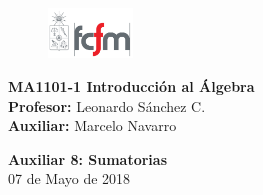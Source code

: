 \documentclass[letterpaper,11pt]{article}
\theoremstyle{plain}
\begin{document}
\newpage
\pagestyle{fancy}
\fancyhf{}

\begin{figure} %
    \vspace{-5mm}
    \includegraphics[width=0.2\textwidth]{img/fcfm2.png}
\end{figure}


\noindent
\textbf{MA1101-1 Introducción al Álgebra}\\
\textbf{Profesor: }Leonardo Sánchez C.\\
\textbf{Auxiliar: }Marcelo Navarro

\begin{center}
{\bf \Large Auxiliar 8: Sumatorias}\\
{07 de Mayo de 2018}
\end{center}
\end{document}
